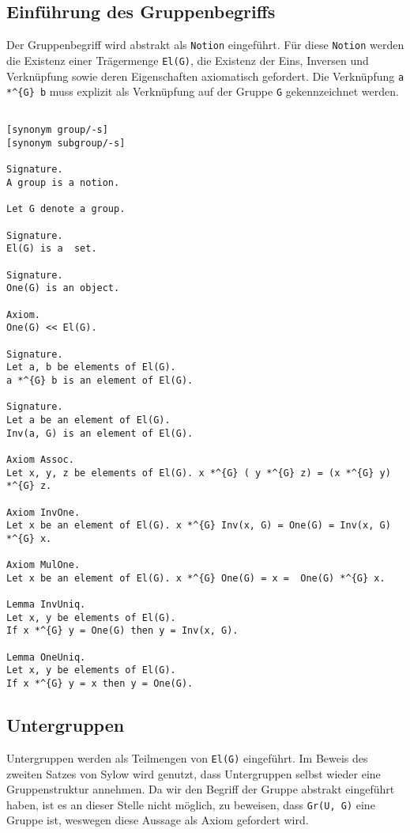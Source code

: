 \documentclass[a4paper,12pt]{scrartcl}
\begin{document}
\subsection{Einführung des Gruppenbegriffs}

Der Gruppenbegriff wird abstrakt als \verb!Notion! eingeführt.
Für diese \verb!Notion! werden die Existenz einer Trägermenge \verb!El(G)!, die Existenz der Eins, Inversen und Verknüpfung sowie deren Eigenschaften axiomatisch gefordert.
Die Verknüpfung \verb!a *^{G} b! muss explizit als Verknüpfung auf der Gruppe \verb!G! gekennzeichnet werden.

\begin{lstlisting}

[synonym group/-s]
[synonym subgroup/-s]

Signature.
A group is a notion.

Let G denote a group.

Signature.
El(G) is a  set.

Signature.
One(G) is an object.

Axiom.
One(G) << El(G).

Signature.
Let a, b be elements of El(G).
a *^{G} b is an element of El(G).

Signature.
Let a be an element of El(G).
Inv(a, G) is an element of El(G).

Axiom Assoc.
Let x, y, z be elements of El(G). x *^{G} ( y *^{G} z) = (x *^{G} y) *^{G} z. 

Axiom InvOne.
Let x be an element of El(G). x *^{G} Inv(x, G) = One(G) = Inv(x, G) *^{G} x.

Axiom MulOne.
Let x be an element of El(G). x *^{G} One(G) = x =  One(G) *^{G} x.

Lemma InvUniq.
Let x, y be elements of El(G).
If x *^{G} y = One(G) then y = Inv(x, G).

Lemma OneUniq.
Let x, y be elements of El(G).
If x *^{G} y = x then y = One(G).

\end{lstlisting}

\subsection{Untergruppen}

Untergruppen werden als Teilmengen von \verb!El(G)! eingeführt.
Im Beweis des zweiten Satzes von Sylow wird genutzt, dass Untergruppen selbst wieder eine Gruppenstruktur annehmen. Da wir den Begriff der Gruppe abstrakt eingeführt haben, ist es an dieser Stelle nicht möglich, zu beweisen, dass \verb!Gr(U, G)! eine Gruppe ist, weswegen diese Aussage als Axiom gefordert wird.
\end{document}
